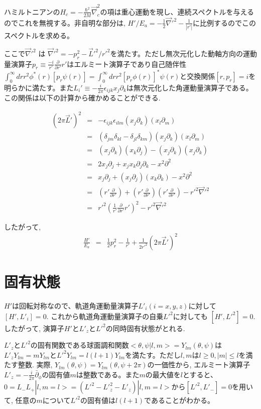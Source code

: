 \documentclass[11pt,a4paper]{jsarticle}
\begin{document}
ハミルトニアンの$H_c = -\frac{\hbar^2}{2M} \vec{\nabla}_c^2$の項は重心運動を現し、連続スペクトルを与えるのでこれを無視する。非自明な部分は, $H'/E_a =- \frac{1}{2} \vec{\nabla}'^2 -\frac{1}{|r'|}$に比例するのでこのスペクトルを求める。

ここで$\vec{\nabla}'^2$ は $\vec{\nabla}'^2= -p_r^2 -\vec{L}'^2/r'^2$を満たす。ただし無次元化した動軸方向の運動量演算子$p_r \equiv\frac{-i}{r'}\frac{\partial}{\partial r'} r'$はエルミート演算子であり自己随伴性$\int _0^\infty dr r^2 \phi^*(r) [ p_r \psi(r) ] = \int _0^\infty dr r^2 [ p_r \phi(r) ]^* \psi(r) $と交換関係$[r,p_r]=i$を明らかに満たす。また$L_i' \equiv -\frac{i}{2\pi} \epsilon_{ijk} x_j\partial_k$は無次元化した角運動量演算子である。この関係は以下の計算から確かめることができる.

\begin{eqnarray}
(2\pi\vec{L}')^2 &=& - \epsilon_{ijk}\epsilon_{ilm} (x_j\partial_k)(x_l\partial_m)\\
&=& (\delta_{jm}\delta_{kl} - \delta_{jl}\delta_{km}) (x_j\partial_k)(x_l\partial_m)\\
&=& (x_j\partial_k)(x_k\partial_j) -(x_j\partial_k)(x_j\partial_k)\\
&=& 2 x_j\partial_j + x_j x_k \partial_j \partial_k  - x^2 \partial^2\\
&=& x_j\partial_j + ( x_j \partial_j)( x_k \partial_k)  - x^2 \partial^2\\
&=& ( r' \frac{\partial}{\partial r'}) + ( r' \frac{\partial}{\partial r'})( r' \frac{\partial}{\partial r'}) - r'^2 \vec{\nabla}'^2\\
&=& r'^2 ( \frac{1}{r'} \frac{\partial}{\partial r'} r' )^2 - r'^2 \vec{\nabla}'^2
\end{eqnarray}

したがって, 
\begin{eqnarray}
\frac{H'}{E_a} &=& \frac{1}{2}p_r^2 - \frac{1}{r'} + \frac{1}{2 r'^2} (2\pi\vec{L}')^2 
\end{eqnarray}

\section{固有状態}

$H'$は回転対称なので、軌道角運動量演算子$L'_i (i=x,y,z)$に対して$[H', L'_i]=0$. これから軌道角運動量演算子の自乗$L'^2$に対しても $[H', L'^2]=0$. したがって, 演算子$H'$と$L'_z$と$L'^2$の同時固有状態がとれる.  

$L'_z$と$L'^2$の固有関数である球面調和関数$<\theta,\psi|l,m>=Y_{lm}(\theta,\psi)$は$L'_zY_{lm}=mY_{lm}$と$L'^2Y_{lm}=l(l+1)Y_{lm}$を満たす。ただし$l,m$は$l \ge 0, |m|\le l$を満たす整数. 実際, $Y_{lm}(\theta,\psi)=Y_{lm}(\theta,\psi+2\pi)$の一価性から, エルミート演算子$L'_z =-\frac{i}{2\pi}\bar\partial_\phi$の固有値$m$は整数である。また$m$の最大値を$l$とすると、$0=L_-L_+|l,m=l>=(L'^2-L'^2_z-L'_z)|l,m=l>$から$[L'^2, L'_-]=0$を用いて, 任意の$m$について$L'^2$の固有値は$l(l+1)$であることがわかる。
\end{document}
